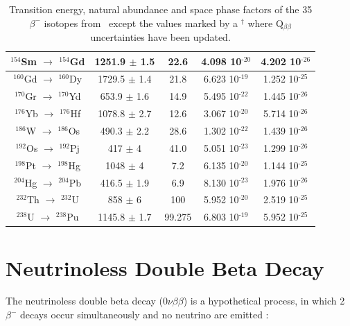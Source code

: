 \documentclass[main.tex]{subfiles}
\begin{document}
\begin{table}
\begin{tabular}{|c|c|c|c|c|}
\hline
$^{\text{154}}$Sm $\rightarrow$ $^{\text{154}}$Gd & 1251.9 $\pm$ 1.5 & 22.6   & 4.098 10$^{\text{-20}}$ & 4.202 10$^{\text{-26}}$\\ 
\hline
$^{\text{160}}$Gd $\rightarrow$ $^{\text{160}}$Dy & 1729.5 $\pm$ 1.4 & 21.8   & 6.623 10$^{\text{-19}}$ & 1.252 10$^{\text{-25}}$\\ 
\hline
$^{\text{170}}$Gr $\rightarrow$ $^{\text{170}}$Yd & 653.9  $\pm$ 1.6 & 14.9   & 5.495 10$^{\text{-22}}$ & 1.445 10$^{\text{-26}}$\\ 
\hline
$^{\text{176}}$Yb $\rightarrow$ $^{\text{176}}$Hf & 1078.8 $\pm$ 2.7 & 12.6   & 3.067 10$^{\text{-20}}$ & 5.714 10$^{\text{-26}}$\\ 
\hline
$^{\text{186}}$W $\rightarrow$ $^{\text{186}}$Os & 490.3   $\pm$ 2.2 & 28.6   & 1.302 10$^{\text{-22}}$ & 1.439 10$^{\text{-26}}$\\ 
\hline
$^{\text{192}}$Os $\rightarrow$ $^{\text{192}}$Pj & 417    $\pm$ 4   & 41.0   & 5.051 10$^{\text{-23}}$ & 1.299 10$^{\text{-26}}$\\ 
\hline 
$^{\text{198}}$Pt $\rightarrow$ $^{\text{198}}$Hg & 1048   $\pm$ 4   & 7.2    & 6.135 10$^{\text{-20}}$ & 1.144 10$^{\text{-25}}$\\
\hline 
$^{\text{204}}$Hg $\rightarrow$ $^{\text{204}}$Pb & 416.5  $\pm$ 1.9 & 6.9    & 8.130 10$^{\text{-23}}$ & 1.976 10$^{\text{-26}}$\\
\hline 
$^{\text{232}}$Th $\rightarrow$ $^{\text{232}}$U & 858     $\pm$ 6   & 100    & 5.952 10$^{\text{-20}}$ & 2.519 10$^{\text{-25}}$\\
\hline 
$^{\text{238}}$U $\rightarrow$ $^{\text{238}}$Pu & 1145.8  $\pm$ 1.7 & 99.275 & 6.803 10$^{\text{-19}}$ & 5.952 10$^{\text{-25}}$\\ 
\hline
\end{tabular}
\caption{Transition energy, natural abundance and space phase factors of the 35 $\beta^{-}$ isotopes from~\cite{ParameterBBisotopes} except the values marked by a $^{\dagger}$ where Q$_{\beta\beta}$ uncertainties have been updated.}
\label{tab:2nuIsotopes}
\end{table}


\FloatBarrier


\section{Neutrinoless Double Beta Decay}\label{sec:0NeutrinoDBD}


\NI The neutrinoless double beta decay (0$\nu\beta\beta$) is a hypothetical process, in which 2$\beta^{-}$ decays occur simultaneously and no neutrino are emitted :
\end{document}
